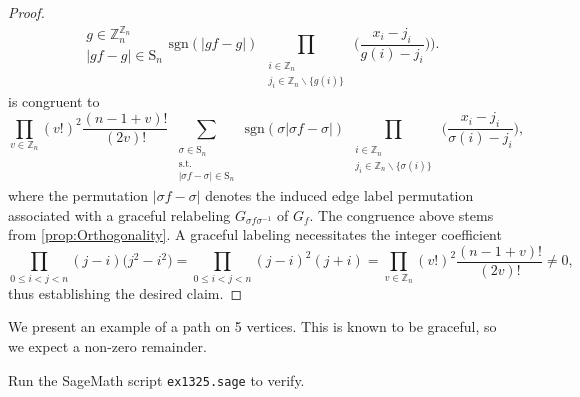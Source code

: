 \begin{proof}
\[{\begin{array}{c}
g\in\mathbb{Z}_{n}^{\mathbb{Z}_{n}}\\
|gf-g|\in\text{S}_{n}
\end{array}}\text{sgn}(|gf-g|)\prod_{\begin{array}{c}
\substack{i\in\mathbb{Z}_{n}\\
j_{i}\in\mathbb{Z}_{n}\backslash\{g(i)\}
}
\end{array}}\big(\frac{x_{i}-j_{i}}{g(i)-j_{i}}\big)\bigg).
\]
is congruent to
\begin{equation} \label{eq:graceful-evaluation}
\prod_{v\in\mathbb{Z}_{n}}(v!)^{2}\frac{(n-1+v)!}{(2v)!}\sum_{\begin{array}{c}
\substack{\sigma\in\text{S}_{n}\\
\text{s.t.}\\
\left|\sigma f-\sigma\right|\in\text{S}_{n}
}
\end{array}}\text{sgn}(\sigma\left|\sigma f-\sigma\right|)\prod_{\begin{array}{c}
\substack{i\in\mathbb{Z}_{n}\\
j_{i}\in\mathbb{Z}_{n}\backslash\{\sigma(i)\}
}
\end{array}}\big(\frac{x_{i}-j_{i}}{\sigma(i)-j_{i}}\big),
\end{equation}
where the permutation $|\sigma f-\sigma |$ denotes the induced edge label permutation associated with a graceful relabeling $G_{\sigma f\sigma^{-1}}$ of $G_f$.
The congruence above stems from \ref{prop:Orthogonality}. A graceful labeling necessitates the integer coefficient
\[
\prod_{0\le i<j<n}(j-i)\big(j^{2}-i^{2})=\prod_{0\le i<j<n}(j-i)^{2}(j+i)=\prod_{v\in\mathbb{Z}_{n}}\left(v!\right)^{2}\frac{\left(n-1+v\right)!}{\left(2v\right)!} \neq 0,
\]
thus establishing the desired claim.
\end{proof}
\begin{example} We present an example of a path on 5 vertices. This is known to be graceful, so we expect a non-zero remainder.
\ \\
\begin{center}   
\end{center}
Run the SageMath script \texttt{ex1325.sage} to verify.
\end{example}
